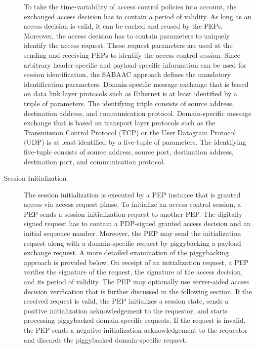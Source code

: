 \begin{description}
    To take the time-variability of access control policies into account, the exchanged access decision has to contain a period of validity.
    As long as an access decision is valid, it can be cached and reused by the PEPs.
    Moreover, the access decision has to contain parameters to uniquely identify the access request.
    These request parameters are used at the sending and receiving PEPs to identify the access control session.
    Since arbitrary header-specific and payload-specific information can be used for session identification, the SABAAC approach defines the mandatory identification parameters.
    Domain-specific message exchange that is based on data link layer protocols such as Ethernet is at least identified by a triple of parameters.
    The identifying triple consists of source address, destination address, and communication protocol.
    Domain-specific message exchange that is based on transport layer protocols such as the Transmission Control Protocol (TCP) or the User Datagram Protocol (UDP) is at least identified by a five-tuple of parameters.
    The identifying five-tuple consists of source address, source port, destination address, destination port, and communication protocol.
    \item[Session Initialization] The session initialization is executed by a PEP instance that is granted access via access request phase.
    To initialize an access control session, a PEP sends a session initialization request to another PEP.
    The digitally signed request has to contain a PDP-signed granted access decision and an initial sequence number.
    Moreover, the PEP may send the initialization request along with a domain-specific request by piggybacking a payload exchange request.
    A more detailed examination of the piggybacking approach is provided below.
    On receipt of an initialization request, a PEP verifies the signature of the request, the signature of the access decision, and its period of validity.
    The PEP may optionally use server-aided access decision verification that is further discussed in the following section.
    If the received request is valid, the PEP initializes a session state, sends a positive initialization acknowledgement to the requestor, and starts processing piggybacked domain-specific requests.
    If the request is invalid, the PEP sends a negative initialization acknowledgement to the requestor and discards the piggybacked domain-specific request.


\end{description}
